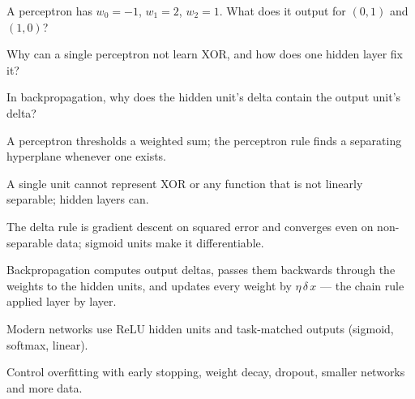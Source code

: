 \begin{checkpoint}
\begin{tightnum}
  \item A perceptron has $w_0 = -1$, $w_1 = 2$, $w_2 = 1$. What does it output for
        $(0, 1)$ and $(1, 0)$?
  \item Why can a single perceptron not learn XOR, and how does one hidden layer
        fix it?
  \item In backpropagation, why does the hidden unit's delta contain the output
        unit's delta?
\end{tightnum}
\end{checkpoint}

\begin{chaptersummary}
\begin{tight}
  \item A perceptron thresholds a weighted sum; the perceptron rule finds a
        separating hyperplane whenever one exists.
  \item A single unit cannot represent XOR or any function that is not linearly
        separable; hidden layers can.
  \item The delta rule is gradient descent on squared error and converges even on
        non-separable data; sigmoid units make it differentiable.
  \item Backpropagation computes output deltas, passes them backwards through the
        weights to the hidden units, and updates every weight by
        $\eta\,\delta\,x$ --- the chain rule applied layer by layer.
  \item Modern networks use ReLU hidden units and task-matched outputs
        (sigmoid, softmax, linear).
  \item Control overfitting with early stopping, weight decay, dropout, smaller
        networks and more data.
\end{tight}
\end{chaptersummary}

